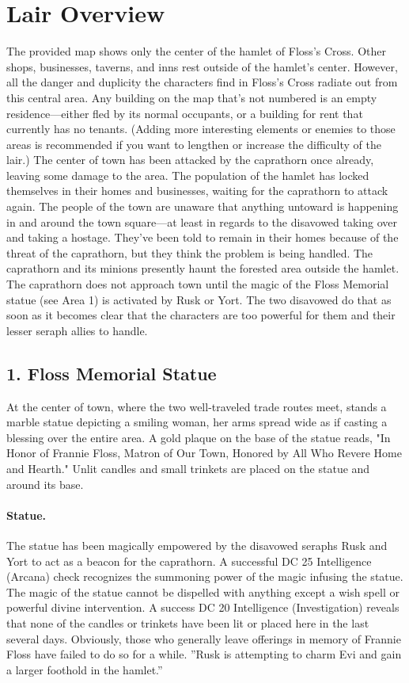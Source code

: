 \documentclass[10pt,a4paper,twoside,twocolumn,openany,bg=print,nodeprecatedcode]{dndbook}
\begin{document}
\section{Lair Overview}
The provided map shows only the center of the hamlet of Floss's Cross. Other shops, businesses, taverns, and inns rest outside of the hamlet's center. However, all the danger and duplicity the characters find in Floss's Cross radiate out from this central area. Any building on the map that's not numbered is an empty residence—either fled by its normal occupants, or a building for rent that currently has no tenants. (Adding more interesting elements or enemies to those areas is recommended if you want to lengthen or increase the difficulty of the lair.)
The center of town has been attacked by the caprathorn once already, leaving some damage to the area. The population of the hamlet has locked themselves in their homes and businesses, waiting for the caprathorn to attack again. The people of the town are unaware that anything untoward is happening in and around the town square—at least in regards to the disavowed taking over and taking a hostage. They've been told to remain in their homes because of the threat of the caprathorn, but they think the problem is being handled.
The caprathorn and its minions presently haunt the forested area outside the hamlet. The caprathorn does not approach town until the magic of the Floss Memorial statue (see Area 1) is activated by Rusk or Yort. The two disavowed do that as soon as it becomes clear that the characters are too powerful for them and their lesser seraph allies to handle.
\subsection{1. Floss Memorial Statue}
\begin{DndReadAloud}{}
At the center of town, where the two well-traveled trade routes meet, stands a marble statue depicting a smiling woman, her arms spread wide as if casting a blessing over the entire area. A gold plaque on the base of the statue reads, "In Honor of Frannie Floss, Matron of Our Town, Honored by All Who Revere Home and Hearth." Unlit candles and small trinkets are placed on the statue and around its base.
\end{DndReadAloud}

\paragraph{Statue.}
The statue has been magically empowered by the disavowed seraphs Rusk and Yort to act as a beacon for the caprathorn. A successful DC 25 Intelligence (Arcana) check recognizes the summoning power of the magic infusing the statue. The magic of the statue cannot be dispelled with anything except a wish spell or powerful divine intervention.
A success DC 20 Intelligence (Investigation) reveals that none of the candles or trinkets have been lit or placed here in the last several days. Obviously, those who generally leave offerings in memory of Frannie Floss have failed to do so for a while.
\DndQuote%
{}
{''Rusk is attempting to charm Evi and gain a larger foothold in the hamlet.''}
{}
\end{document}
